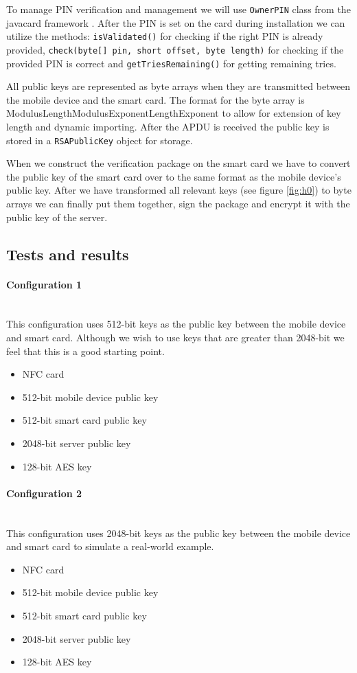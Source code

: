 To manage PIN verification and management we will use \texttt{OwnerPIN} class from the javacard framework \cite{ownerpin}. After the PIN is set on the card during installation we can utilize the methods: \texttt{isValidated()} for checking if the right PIN is already provided, \texttt{check(byte[] pin, short offset, byte length)} for checking if the provided PIN is correct and \texttt{getTriesRemaining()} for getting remaining tries.

All public keys are represented as byte arrays when they are transmitted between the mobile device and the smart card. The format for the byte array is \textbar{}ModulusLength\textbar{}Modulus\textbar{}ExponentLength\textbar{}Exponent\textbar{} to allow for extension of key length and dynamic importing. After the APDU is received the public key is stored in a \texttt{RSAPublicKey} object for storage.

When we construct the verification package on the smart card we have to convert the public key of the smart card over to the same format as the mobile device's public key. After we have transformed all relevant keys (see figure \ref{fig:h0}) to byte arrays we can finally put them together, sign the package and encrypt it with the public key of the server.

\subsection{Tests and results}
\paragraph{Configuration 1}\mbox{}\\
This configuration uses 512-bit keys as the public key between the mobile device and smart card. Although we wish to use keys that are greater than 2048-bit we feel that this is a good starting point.
\begin{itemize}
    \item NFC card
    \item 512-bit mobile device public key
    \item 512-bit smart card public key
    \item 2048-bit server public key
    \item 128-bit AES key
\end{itemize}

\paragraph{Configuration 2}\mbox{}\\
This configuration uses 2048-bit keys as the public key between the mobile device and smart card to simulate a real-world example.
\begin{itemize}
    \item NFC card
    \item 512-bit mobile device public key
    \item 512-bit smart card public key
    \item 2048-bit server public key
    \item 128-bit AES key
\end{itemize}

